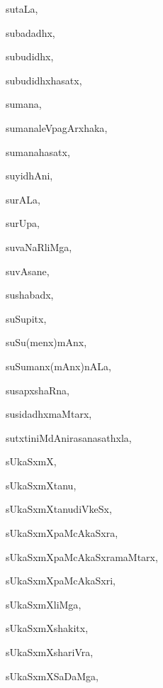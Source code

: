 \begin{multicols}{3}
{\noindent
{sutaLa}, \pageref{sutaLa}

\noindent
{subadadhx}, \pageref{subadadhx}

\noindent
{subudidhx}, \pageref{subudidhx}

\noindent
{subudidhxhasatx}, \pageref{subudidhxhasatx}

\noindent
{sumana}, \pageref{sumana}

\noindent
{sumanaleVpagArxhaka}, \pageref{sumanaleVpagArxhaka}

\noindent
{sumanahasatx}, \pageref{sumanahasatx}

\noindent
{suyidhAni}, \pageref{suyidhAni}

\noindent
{surALa}, \pageref{surALa}

\noindent
{surUpa}, \pageref{surUpa}

\noindent
{suvaNaRliMga}, \pageref{suvaNaRliMga}

\noindent
{suvAsane}, \pageref{suvAsane}

\noindent
{sushabadx}, \pageref{sushabadx}

\noindent
{suSupitx}, \pageref{suSupitx}

\noindent
{suSu(menx)mAnx}, \pageref{suSumenxmAnx}

\noindent
{suSumanx(mAnx)nALa}, \pageref{suSumanxmAnxnALa}

\noindent
{susapxshaRna}, \pageref{susapxshaRna}

\noindent
{susidadhxmaMtarx}, \pageref{susidadhxmaMtarx}

\noindent
{sutxtiniMdAnirasanasathxla}, \pageref{sutxtiniMdAnirasanasathxla}

\noindent
{sUkaSxmX}, \pageref{sUkaSxmX}

\noindent
{sUkaSxmXtanu}, \pageref{sUkaSxmXtanu}

\noindent
{sUkaSxmXtanudiVkeSx}, \pageref{sUkaSxmXtanudiVkeSx}

\noindent
{sUkaSxmXpaMcAkaSxra}, \pageref{sUkaSxmXpaMcAkaSxra}

\noindent
{sUkaSxmXpaMcAkaSxramaMtarx}, \pageref{sUkaSxmXpaMcAkaSxramaMtarx}

\noindent
{sUkaSxmXpaMcAkaSxri}, \pageref{sUkaSxmXpaMcAkaSxri}

\noindent
{sUkaSxmXliMga}, \pageref{sUkaSxmXliMga}

\noindent
{sUkaSxmXshakitx}, \pageref{sUkaSxmXshakitx}

\noindent
{sUkaSxmXshariVra}, \pageref{sUkaSxmXshariVra}

\noindent
{sUkaSxmXSaDaMga}, \pageref{sUkaSxmXSaDaMga}

}
\end{multicols}
